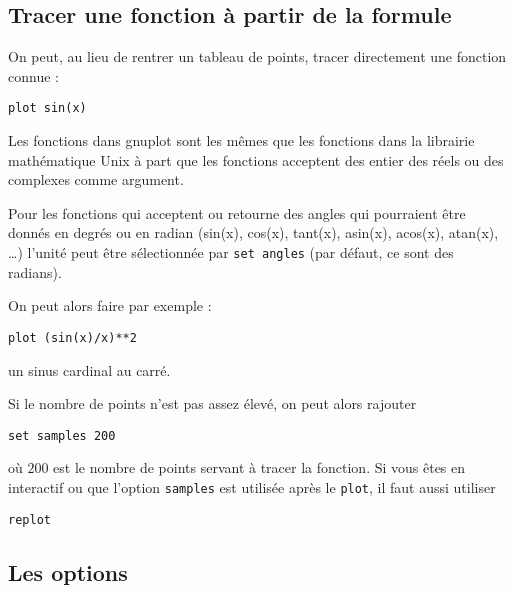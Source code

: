 \documentclass[a4paper,twoside]{article}
\begin{document}
\subsection{Tracer une fonction à partir de la formule}
On peut, au lieu de rentrer un tableau de points, tracer directement une fonction connue : 
\begin{verbatim}
plot sin(x)
\end{verbatim}

Les fonctions dans gnuplot sont les mêmes que les fonctions dans la librairie mathématique Unix à part que les fonctions acceptent des entier des réels ou des complexes comme argument. 

\begin{remarque}
Pour les fonctions qui acceptent ou retourne des angles qui pourraient être donnés en degrés ou en radian (sin(x), cos(x), tant(x), asin(x), acos(x), atan(x), \dots) l'unité peut être sélectionnée par \texttt{set angles} (par défaut, ce sont des radians).
\end{remarque}

On peut alors faire par exemple : 
\begin{verbatim}
plot (sin(x)/x)**2
\end{verbatim}
un sinus cardinal au carré.

Si le nombre de points n'est pas assez élevé, on peut alors rajouter
\begin{verbatim}
set samples 200
\end{verbatim}
où $200$ est le nombre de points servant à tracer la fonction. Si vous êtes en interactif ou que l'option \texttt{samples} est utilisée après le \texttt{plot}, il faut aussi utiliser
\begin{verbatim}
replot
\end{verbatim}



\subsection{Les options}

\printindex
\end{document}
